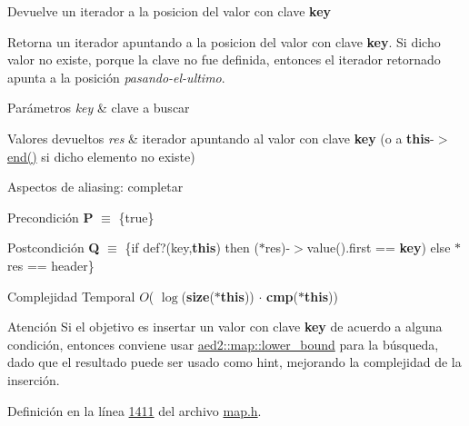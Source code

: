 Devuelve un iterador a la posicion del valor con clave {\bfseries key} 

Retorna un iterador apuntando a la posicion del valor con clave {\bfseries key}. Si dicho valor no existe, porque la clave no fue definida, entonces el iterador retornado apunta a la posición {\itshape pasando-\/el-\/ultimo}.


\begin{DoxyParams}{Parámetros}
{\em key} & clave a buscar \\
\hline
\end{DoxyParams}

\begin{DoxyRetVals}{Valores devueltos}
{\em res} & iterador apuntando al valor con clave {\bfseries key} (o a {\bfseries this}-\/$>$\hyperlink{classaed2_1_1map_a76023e6a56cb625513e1b5ea028bf983_a76023e6a56cb625513e1b5ea028bf983}{end()} si dicho elemento no existe)\\
\hline
\end{DoxyRetVals}
\begin{DoxyParagraph}{Aspectos de aliasing\+:}
completar
\end{DoxyParagraph}
\begin{DoxyPrecond}{Precondición}
{\bfseries P} $\equiv$ \{true\} 
\end{DoxyPrecond}
\begin{DoxyPostcond}{Postcondición}
{\bfseries Q} $\equiv$ \{if def?(key,{\bfseries this}) then ($\ast$res)-\/$>$value().first == {\bfseries key}) else $\ast$res == header\}
\end{DoxyPostcond}

\begin{DoxyDescription}
\item[Complejidad Temporal]$O$( $\log$({\bfseries size}({\bfseries $\ast$this})) $\cdot$ {\bfseries cmp}({\bfseries $\ast$this}))
\end{DoxyDescription}

\begin{DoxyAttention}{Atención}
Si el objetivo es insertar un valor con clave {\bfseries key} de acuerdo a alguna condición, entonces conviene usar \hyperlink{classaed2_1_1map_a62075a47afdf89267c5462f88164af3d_a62075a47afdf89267c5462f88164af3d}{aed2\+::map\+::lower\+\_\+bound} para la búsqueda, dado que el resultado puede ser usado como hint, mejorando la complejidad de la inserción. 
\end{DoxyAttention}


Definición en la línea \hyperlink{map_8h_source_l01411}{1411} del archivo \hyperlink{map_8h_source}{map.\+h}.

